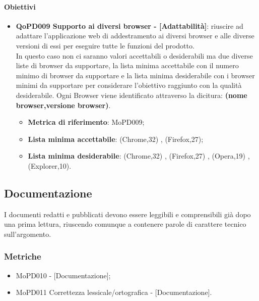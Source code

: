\documentclass[../piano-di-qualifica.tex]{subfiles}
\begin{document}
\paragraph{Obiettivi}
\label{sub:obiettivi}
\begin{itemize}
    \item \textbf{QoPD009 Supporto ai diversi browser - [Adattabilità]}: riuscire ad adattare l'applicazione web di addestramento ai diversi browser e alle diverse versioni di essi per eseguire tutte le funzioni del prodotto.
        \\ In questo caso non ci saranno valori accettabili o desiderabili ma due diverse liste di browser da supportare, la lista minima accettabile con il numero minimo di browser da supportare e la lista minima desiderabile con i browser minimi da supportare per considerare l'obiettivo raggiunto con la qualità desiderabile.
        Ogni Browser viene identificato attraverso la dicitura: \textbf{(nome browser,versione browser)}.
        \begin{itemize}
            \item \textbf{Metrica di riferimento}: MoPD009;
            \item \textbf{Lista minima accettabile}: {(Chrome,32) , (Firefox,27)};
            \item \textbf{Lista minima desiderabile}: {(Chrome,32) , (Firefox,27) , (Opera,19) , (Explorer,10)}.
        \end{itemize}
\end{itemize}

\subsection{Documentazione}%
\label{sub:documentazione}
I documenti redatti e pubblicati devono essere leggibili e comprensibili già dopo una prima lettura, riuscendo comunque a contenere parole di carattere tecnico sull'argomento.

\subsubsection{Metriche}
\label{sub:metriche}
\begin{itemize}
    \item MoPD010  - [Documentazione];
    \item MoPD011 Correttezza lessicale/ortografica - [Documentazione].
\end{itemize}
\end{document}
